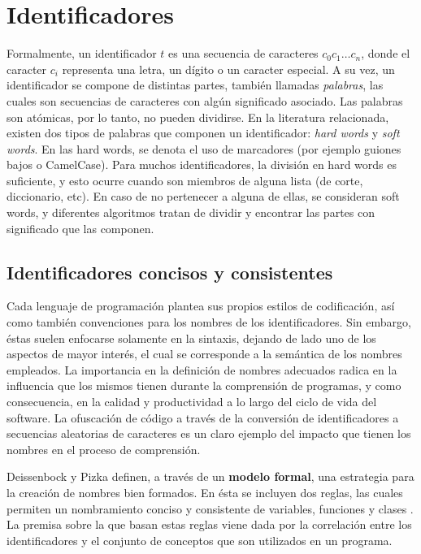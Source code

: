 \section{Identificadores}
Formalmente, un identificador $t$ es una secuencia de caracteres $c_0 c_1 \dots c_n$, donde el caracter $c_i$ representa una letra, un dígito o un caracter especial.
A su vez, un identificador se compone de distintas partes, también llamadas \textit{palabras}, las cuales son secuencias de caracteres con algún significado asociado.
Las palabras son atómicas, por lo tanto, no pueden dividirse.
En la literatura relacionada, existen dos tipos de palabras que componen un identificador: \textit{hard words} y \textit{soft words}.
En las hard words, se denota el uso de marcadores (por ejemplo guiones bajos o CamelCase).
Para muchos identificadores, la división en hard words es suficiente, y esto ocurre cuando son miembros de alguna lista (de corte, diccionario, etc).
En caso de no pertenecer a alguna de ellas, se consideran soft words, y diferentes algoritmos tratan de dividir y encontrar las partes con significado que las componen.

\subsection{Identificadores concisos y consistentes}
Cada lenguaje de programación plantea sus propios estilos de codificación, así como también convenciones para los nombres de los identificadores. 
Sin embargo, éstas suelen enfocarse solamente en la sintaxis, dejando de lado uno de los aspectos de mayor interés, el cual se corresponde a la semántica de los nombres empleados. 
La importancia en la definición de nombres adecuados radica en la influencia que los mismos tienen durante la comprensión de programas, y como consecuencia, en la calidad y productividad a lo largo del ciclo de vida del software. 
La ofuscación de código a través de la conversión de identificadores a secuencias aleatorias de caracteres es un claro ejemplo del impacto que tienen los nombres en el proceso de comprensión.

Deissenbock y Pizka definen, a través de un \textbf{modelo formal}, una estrategia para la creación de nombres bien formados. 
En ésta se incluyen dos reglas, las cuales permiten un nombramiento conciso y consistente de variables, funciones y clases \cite{DeiBenbockPizka05}. 
La premisa sobre la que basan estas reglas viene dada por la correlación entre los identificadores y el conjunto de conceptos que son utilizados en un programa.

